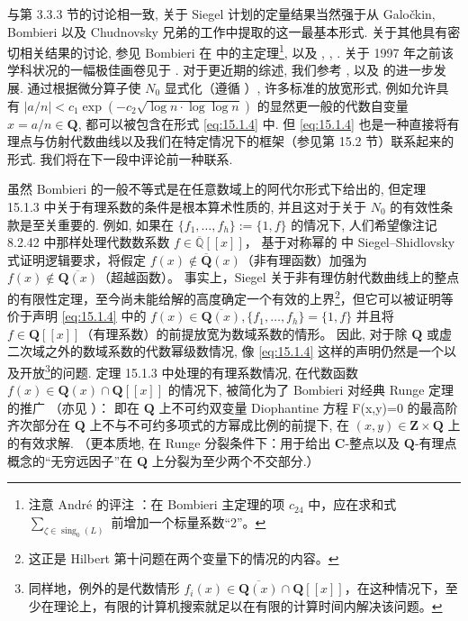 \begin{remark}\label{rem:15.1.5}
与第 3.3.3 节的讨论相一致, 关于 Siegel 计划的定量结果当然强于从 Galo{\v{c}}kin, Bombieri 以及 Chudnovsky 兄弟的工作中提取的这一最基本形式. 
关于其他具有密切相关结果的讨论, 参见 Bombieri 在 \cite[第 49 页]{Bom81} 中的主定理\setcounter{footnote}{38}\footnote{注意 Andr{\'e} 的评注 \cite[第 79 页]{And89}：在 Bombieri 主定理的项 $c_{24}$ 中，应在求和式 $\sum_{\zeta \in \operatorname{sing}_0(L)}$ 前增加一个标量系数“2”。}, 
以及 \cite[定理 I 以及 II]{CC85a}, \cite[第 1.2 节主定理]{Deb86}, \cite[第 VII 节]{And89}. 
关于 1997 年之前该学科状况的一幅极佳画卷见于 \cite[第 5 章第 7 节]{PS98}. 
对于更近期的综述, 我们参考 \cite[第 5.6 节]{Riv19}, 
以及 \cite{FR18} 的进一步发展. 
通过根据微分算子使 \(N_0\) 显式化（遵循 \cite{Bom81}）, 
许多标准的放宽形式, 例如允许具有 \(|a/n| < c_1 \exp\left(-c_2\sqrt{\log n \cdot \log\log n}\right)\) 
的显然更一般的代数自变量 \(x = a/n \in \mathbf{Q}\), 
都可以被包含在形式 \eqref{eq:15.1.4} 中. 
但 \eqref{eq:15.1.4} 也是一种直接将有理点与仿射代数曲线以及我们在特定情况下的框架（参见第 15.2 节）联系起来的形式. 
我们将在下一段中评论前一种联系.

虽然 Bombieri 的一般不等式是在任意数域上的阿代尔形式下给出的, 
但定理 15.1.3 中关于有理系数的条件是根本算术性质的, 
并且这对于关于 \(N_0\) 的有效性条款是至关重要的. 
例如, 如果在 \(\{f_1,\ldots,f_h\}:=\{1,f\}\) 的情况下, 
人们希望像注记 8.2.42 中那样处理代数数系数 \(f \in \overline{\mathbb{Q}}[\![x]\!]\)，
基于对称幂的 \cite[第 7 节]{CC85a} 中 Siegel--Shidlovsky 式证明逻辑要求，将假定 \(f(x) \notin \overline{\mathbf{Q}}(x)\)（非有理函数）加强为 \(f(x) \notin \overline{\mathbf{Q}(x)}\)（超越函数）。
事实上，Siegel 关于非有理仿射代数曲线上的整点的有限性定理，至今尚未能给解的高度确定一个有效的上界\footnote{这正是 Hilbert 第十问题在两个变量下的情况的内容。}，但它可以被证明等价于声明 \eqref{eq:15.1.4} 中的 \(f(x) \in \overline{\mathbf{Q}(x)}, \{f_1, \dots, f_h\} = \{1, f\}\) 并且将 \(f \in \mathbf{Q}[\![x]\!]\)（有理系数）的前提放宽为数域系数的情形。 
因此, 对于除 \(\mathbf{Q}\) 或虚二次域之外的数域系数的代数幂级数情况, 
像 \eqref{eq:15.1.4} 这样的声明仍然是一个以及开放\setcounter{footnote}{41}\footnote{同样地，例外的是代数情形 $f_i(x) \in \overline{\mathbf{Q}(x)} \cap \mathbf{Q}[\![x]\!]$，在这种情况下，至少在理论上，有限的计算机搜索就足以在有限的计算时间内解决该问题。}的问题. 
定理 15.1.3 中处理的有理系数情况, 在代数函数 \(f(x) \in \mathbf{Q}(x) \cap \mathbf{Q}[\![x]\!]\) 的情况下, 
被简化为了 Bombieri 对经典 Runge 定理的推广 \cite[定理 9.6.6]{BG06}（亦见 \cite[第 IV 节]{Bom83}）： 
即在 \(\mathbf{Q}\) 上不可约双变量 Diophantine 方程 F(x,y)=0 的最高阶齐次部分在 \(\mathbf{Q}\) 上不与不可约多项式的方幂成比例的前提下, 
在 \((x,y) \in \mathbf{Z} \times \mathbf{Q}\) 上的有效求解. 
（更本质地, 在 Runge 分裂条件下：用于给出 \(\mathbf{C}\)-整点以及 \(\mathbf{Q}\)-有理点概念的“无穷远因子”在 \(\mathbf{Q}\) 上分裂为至少两个不交部分.） \end{remark}

